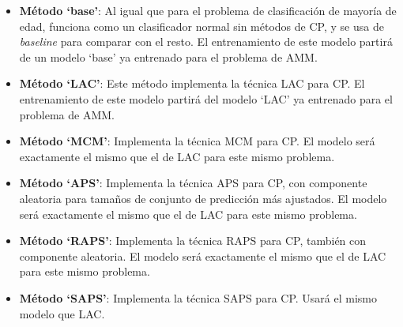 \begin{itemize}

    \item \textbf{Método `base'}: Al igual que para el problema de clasificación de mayoría de edad, funciona como un clasificador normal sin métodos de CP, y se usa de \textit{baseline} para comparar con el resto. El entrenamiento de este modelo partirá de un modelo `base' ya entrenado para el problema de AMM.

    \item \textbf{Método `LAC'}: Este método implementa la técnica LAC para CP. El entrenamiento de este modelo partirá del modelo `LAC' ya entrenado para el problema de AMM.

    \item \textbf{Método `MCM'}: Implementa la técnica MCM para CP. El modelo será exactamente el mismo que el de LAC para este mismo problema. 

    \item \textbf{Método `APS'}: Implementa la técnica APS para CP, con componente aleatoria para tamaños de conjunto de predicción más ajustados. El modelo será exactamente el mismo que el de LAC para este mismo problema.

    \item \textbf{Método `RAPS'}: Implementa la técnica RAPS para CP, también con componente aleatoria. El modelo será exactamente el mismo que el de LAC para este mismo problema. 
    
    \item \textbf{Método `SAPS'}: Implementa la técnica SAPS para CP. Usará el mismo modelo que LAC. 

\end{itemize} 


